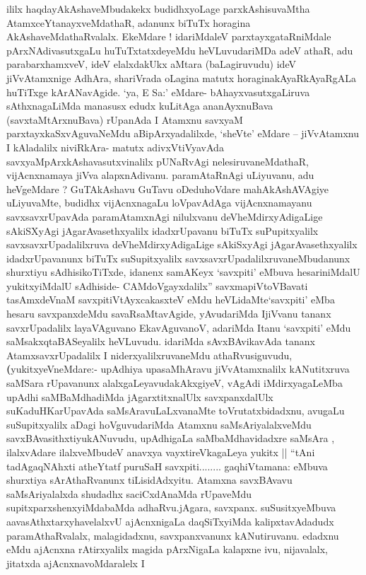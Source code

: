\begin{artha}
ililx haqdayAkAshaveMbudakekx budidhxyoLage parxkAshisuvaMtha
AtamxceYtanayxveMdathaR, adanunx biTuTx horagina
AkAshaveMdathaRvalalx. EkeMdare ! idariMdaleV parxtayxgataRniMdale
pArxNAdivasutxgaLu huTuTxtatxdeyeMdu heVLuvudariMDa adeV athaR, adu
parabarxhamxveV, ideV elalxdakUkx aMtara (baLagiruvudu) ideV
jiVvAtamxnige AdhAra, shariVrada oLagina matutx horaginakAyaRkAyaRgALa
huTiTxge kArANavAgide. `ya, E Sa:' eMdare- bAhayxvasutxgaLiruva
sAthxnagaLiMda manasusx edudx kuLitAga ananAyxnuBava
(savxtaMtArxnuBava) rUpanAda I Atamxnu savxyaM parxtayxkaSxvAguvaNeMdu
aBipArxyadalilxde, `sheVte' eMdare -- jiVvAtamxnu I kAladalilx
niviRkAra- matutx adivxVtiVyavAda savxyaMpArxkAshavasutxvinalilx
pUNaRvAgi nelesiruvaneMdathaR, vijAcnxnamaya jiVva
alapxnAdivanu. paramAtaRnAgi uLiyuvanu, adu heVgeMdare ? GuTAkAshavu
GuTavu oDeduhoVdare mahAkAshAVAgiye uLiyuvaMte, budidhx vijAcnxnagaLu
loVpavAdAga vijAcnxnamayanu savxsavxrUpavAda paramAtamxnAgi nilulxvanu
deVheMdirxyAdigaLige sAkiSXyAgi jAgarAvasethxyalilx idadxrUpavanu
biTuTx suPupitxyalilx savxsavxrUpadalilxruva deVheMdirxyAdigaLige
sAkiSxyAgi jAgarAvasethxyalilx idadxrUpavanunx biTuTx suSupitxyalilx
savxsavxrUpadalilxruvaneMbudanunx shurxtiyu sAdhisikoTiTxde, idanenx
samAKeyx `savxpiti' eMbuva hesariniMdalU yukitxyiMdalU sAdhiside-
CAMdoVgayxdalilx'' savxmapiVtoVBavati tasAmxdeVnaM
savxpitiVtAyxcakasxteV eMdu heVLidaMte`savxpiti' eMba hesaru
savxpanxdeMdu savaRsaMtavAgide, yAvudariMda IjiVvanu tananx
savxrUpadalilx layaVAguvano EkavAguvanoV, adariMda Itanu `savxpiti'
eMdu saMsakxqtaBASeyalilx heVLuvudu. idariMda sAvxBAvikavAda tananx
AtamxsavxrUpadalilx I niderxyalilxruvaneMdu
athaRvusiguvudu,\textbf(yukitxyeVneMdare:- upAdhiya upasaMhAravu
jiVvAtamxnalilx kANutitxruva saMSara rUpavanunx
alalxgaLeyavudakAkxgiyeV, vAgAdi iMdirxyagaLeMba upAdhi saMBaMdhadiMda
jAgarxtitxnalUlx savxpanxdalUlx suKaduHKarUpavAda saMsAravuLaLxvanaMte
toVrutatxbidadxnu, avugaLu suSupitxyalilx aDagi hoVguvudariMda Atamxnu
saMsAriyalalxveMdu savxBAvasithxtiyukANuvudu, upAdhigaLa
saMbaMdhavidadxre saMsAra , ilalxvAdare ilalxveMbudeV anavxya
vayxtireVkagaLeya yukitx || ``tAni tadAgaqNAhxti atheYtatf puruSaH
savxpiti........ gaqhiVtamana: eMbuva shurxtiya sArAthaRvanunx
tiLisidAdxyitu. Atamxna savxBAvavu saMsAriyalalxda shudadhx
saciCxdAnaMda rUpaveMdu supitxparxshenxyiMdabaMda adhaRvu.jAgara,
savxpanx. suSusitxyeMbuva aavasAthxtarxyhavelalxvU ajAcnxnigaLa
daqSiTxyiMda kalipxtavAdadudx paramAthaRvalalx, malagidadxnu,
savxpanxvanunx kANutiruvanu. edadxnu eMdu ajAcnxna rAtirxyalilx magida
pArxNigaLa kalapxne ivu, nijavalalx, jitatxda ajAcnxnavoMdaralelx I

\end{artha}
